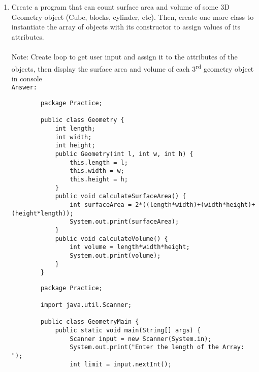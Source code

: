 \documentclass[12pt,titlepage]{article}
\begin{document}
\begin{enumerate}
    \item Create a program that can count surface area and volume of some 3D Geometry object (Cube, blocks, cylinder, etc). Then, create one more class to instantiate the array of objects with its constructor to assign values of its attributes.
    \mbox{}\\
    \mbox{}\\Note: Create loop to get user input and assign it to the attributes of the objects, then display
    the surface area and volume of each 3\textsuperscript{rd} geometry object in console
    \mbox{}\\ \texttt{Answer:}
    \begin{verbatim}
        package Practice;

        public class Geometry {
            int length;
            int width;
            int height;
            public Geometry(int l, int w, int h) {
                this.length = l;
                this.width = w;
                this.height = h;
            }
            public void calculateSurfaceArea() {
                int surfaceArea = 2*((length*width)+(width*height)+(height*length));
                System.out.print(surfaceArea);
            }
            public void calculateVolume() {
                int volume = length*width*height;
                System.out.print(volume);
            }
        }
    \end{verbatim}
    \begin{verbatim}
        package Practice;

        import java.util.Scanner;

        public class GeometryMain {
            public static void main(String[] args) {
                Scanner input = new Scanner(System.in);
                System.out.print("Enter the length of the Array: ");
                int limit = input.nextInt();


\end{verbatim}
\end{enumerate}
\end{document}
